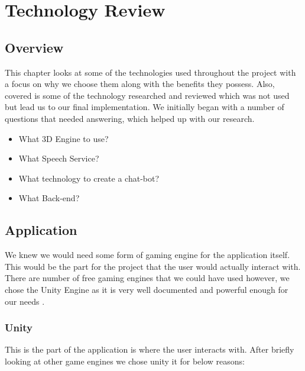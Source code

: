 \chapter{Technology Review}
\section{Overview}
This chapter looks at some of the technologies used throughout the project with a focus on why we choose them along with the benefits they possess. Also, covered is some of the technology researched and reviewed which was not used but lead us to our final implementation. We initially began with a number of questions that needed answering, which helped up with our research. 

\begin{itemize}
    \item What 3D Engine to use?
    \item What Speech Service?
    \item What technology to create a chat-bot?
    \item What Back-end?
\end{itemize}

\section{Application}
We knew we would need some form of gaming engine for the application itself. This would be the part for the project that the user would actually interact with. There are number of free gaming engines that we could have used however, we chose the Unity Engine as it is very well documented and powerful enough for our needs \cite{unity}.

\subsection{Unity}
This is the part of the application is where the user interacts with. After briefly looking at other game engines we chose unity it for below reasons:


